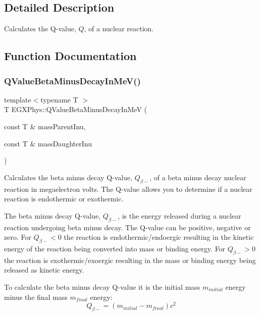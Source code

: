 \subsection{Detailed Description}
Calculates the Q-\/value, $Q$, of a nuclear reaction. 

\subsection{Function Documentation}
\mbox{\label{group___q_value_ga42468e998cf58a027a676755aa1339ba}} 
\subsubsection{\texorpdfstring{Q\+Value\+Beta\+Minus\+Decay\+In\+Me\+V()}{QValueBetaMinusDecayInMeV()}}
{\footnotesize\ttfamily template$<$typename T $>$ \\
T E\+G\+X\+Phys\+::\+Q\+Value\+Beta\+Minus\+Decay\+In\+MeV (\begin{DoxyParamCaption}\item[{const T \&}]{mass\+Parent\+Inu,  }\item[{const T \&}]{mass\+Daughter\+Inu }\end{DoxyParamCaption})}



Calculates the beta minus decay Q-\/value, $Q_{\beta-}$, of a beta minus decay nuclear reaction in megaelectron volts. The Q-\/value allows you to determine if a nuclear reaction is endothermic or exothermic. 

The beta minus decay Q-\/value, $Q_{\beta-}$, is the energy released during a nuclear reaction undergoing beta minus decay. The Q-\/value can be positive, negative or zero. For $Q_{\beta-} < 0$ the reaction is endothermic/endoergic resulting in the kinetic energy of the reaction being converted into mass or binding energy. For $Q_{\beta-} > 0$ the reaction is exothermic/exoergic resulting in the mass or binding energy being released as kinetic energy.

To calculate the beta minus decay Q-\/value it is the initial mass $m_{initial}$ energy minus the final mass $m_{final}$ energy\+: \[Q_{\beta-} = \left ( m_{initial}-m_{final}\right ) c^2\]

